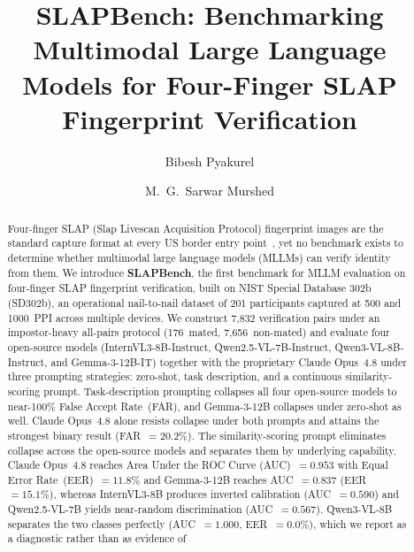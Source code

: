 \documentclass[runningheads]{llncs}
\begin{document}
\title{SLAPBench: Benchmarking Multimodal Large Language Models
       for Four-Finger SLAP Fingerprint Verification}

\author{Bibesh Pyakurel \and M.~G.~Sarwar Murshed}

\maketitle

\begin{abstract}
Four-finger SLAP (Slap Livescan Acquisition Protocol) fingerprint images
are the standard capture format at every US border entry
point~\cite{nist_sd302}, yet no benchmark exists to determine whether
multimodal large language models (MLLMs) can verify identity from them.
%
We introduce \textbf{SLAPBench}, the first benchmark for MLLM evaluation
on four-finger SLAP fingerprint verification, built on NIST Special
Database 302b (SD302b), an operational nail-to-nail dataset of 201
participants captured at 500 and 1000~PPI across multiple devices.
%
We construct 7,832 verification pairs under an impostor-heavy all-pairs
protocol (176~mated, 7,656~non-mated) and evaluate four open-source
models (InternVL3-8B-Instruct, Qwen2.5-VL-7B-Instruct,
Qwen3-VL-8B-Instruct, and Gemma-3-12B-IT) together with the proprietary
Claude Opus~4.8 under three prompting strategies: zero-shot, task
description, and a continuous similarity-scoring prompt.
%
Task-description prompting collapses all four open-source models to
near-100\% False Accept Rate~(FAR), and Gemma-3-12B collapses under
zero-shot as well. Claude Opus~4.8 alone resists collapse under both
prompts and attains the strongest binary result (FAR~$= 20.2\%$).
%
The similarity-scoring prompt eliminates collapse across the open-source
models and separates them by underlying capability. Claude Opus~4.8
reaches Area Under the ROC Curve (AUC)~$= 0.953$ with Equal Error
Rate~(EER)~$= 11.8\%$ and Gemma-3-12B reaches AUC~$= 0.837$
(EER~$= 15.1\%$), whereas InternVL3-8B produces inverted calibration
(AUC~$= 0.590$) and Qwen2.5-VL-7B yields near-random discrimination
(AUC~$= 0.567$).
%
Qwen3-VL-8B separates the two classes perfectly (AUC~$= 1.000$,
EER~$= 0.0\%$), which we report as a diagnostic rather than as evidence of

\end{abstract}
\end{document}
